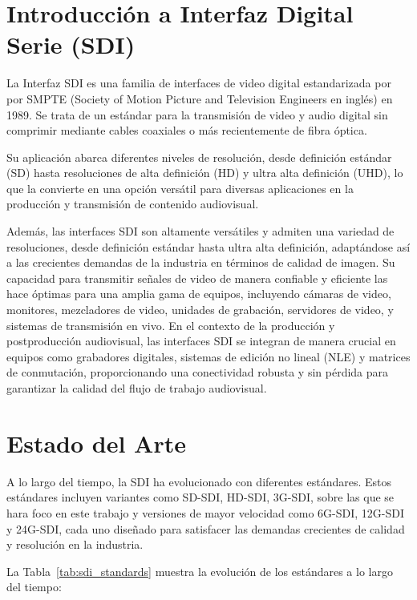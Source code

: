 \section{Introducción a Interfaz Digital Serie (SDI)}

La Interfaz SDI es una familia de interfaces de video digital estandarizada por
por SMPTE (Society of Motion Picture and Television Engineers en inglés) en
1989. Se trata de un estándar para la transmisión de video y audio digital sin
comprimir mediante cables coaxiales o más recientemente de fibra óptica.

Su aplicación abarca diferentes niveles de resolución, desde definición
estándar (SD) hasta resoluciones de alta definición (HD) y ultra alta
definición (UHD), lo que la convierte en una opción versátil para diversas
aplicaciones en la producción y transmisión de contenido audiovisual.

Además, las interfaces SDI son altamente versátiles y admiten una variedad de
resoluciones, desde definición estándar hasta ultra alta definición, adaptándose
así a las crecientes demandas de la industria en términos de calidad de imagen.
Su capacidad para transmitir señales de video de manera confiable y eficiente
las hace óptimas para una amplia gama de equipos, incluyendo cámaras de video,
monitores, mezcladores de video, unidades de grabación, servidores de video, y
sistemas de transmisión en vivo. En el contexto de la producción y
postproducción audiovisual, las interfaces SDI se integran de manera crucial en
equipos como grabadores digitales, sistemas de edición no lineal (NLE) y 
matrices de conmutación, proporcionando una conectividad robusta y sin pérdida
para garantizar la calidad del flujo de trabajo audiovisual.

\section{Estado del Arte}

A lo largo del tiempo, la SDI ha evolucionado con diferentes estándares. Estos
estándares incluyen variantes como SD-SDI, HD-SDI, 3G-SDI, sobre las que se
hara foco en este trabajo y versiones de mayor velocidad como 6G-SDI, 12G-SDI
y 24G-SDI, cada uno diseñado para satisfacer las demandas crecientes de calidad
y resolución en la industria.

La Tabla~\ref{tab:sdi_standards} muestra la evolución de los estándares a lo largo del tiempo:

